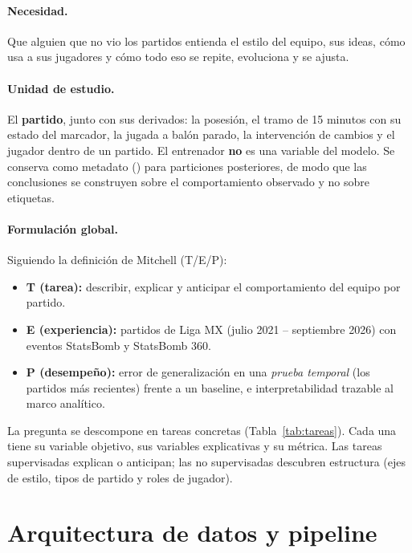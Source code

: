 \documentclass[11pt,a4paper]{article}
\DeclareRobustCommand{\col}[1]{\texttt{\detokenize{#1}}}
\begin{document}
\paragraph{Necesidad.} Que alguien que no vio los partidos entienda el estilo del equipo, sus ideas, cómo usa a sus
jugadores y cómo todo eso se repite, evoluciona y se ajusta.

\paragraph{Unidad de estudio.} El \textbf{partido}, junto con sus derivados: la posesión, el tramo de 15 minutos con su
estado del marcador, la jugada a balón parado, la intervención de cambios y el jugador dentro de un partido. El
entrenador \textbf{no} es una variable del modelo. Se conserva como metadato (\col{team_manager}) para particiones
posteriores, de modo que las conclusiones se construyen sobre el comportamiento observado y no sobre etiquetas.

\paragraph{Formulación global.} Siguiendo la definición de Mitchell (T/E/P):
\begin{itemize}
  \item \textbf{T (tarea):} describir, explicar y anticipar el comportamiento del equipo por partido.
  \item \textbf{E (experiencia):} \nPartidos{} partidos de Liga MX (julio 2021 -- septiembre 2026) con eventos StatsBomb y
        StatsBomb 360.
  \item \textbf{P (desempeño):} error de generalización en una \emph{prueba temporal} (los partidos más recientes) frente
        a un baseline, e interpretabilidad trazable al marco analítico.
\end{itemize}
La pregunta se descompone en tareas concretas (Tabla~\ref{tab:tareas}). Cada una tiene su variable objetivo, sus
variables explicativas y su métrica. Las tareas supervisadas explican o anticipan; las no supervisadas descubren
estructura (ejes de estilo, tipos de partido y roles de jugador).



\section{Arquitectura de datos y pipeline}\label{sec:pipeline}
\end{document}
